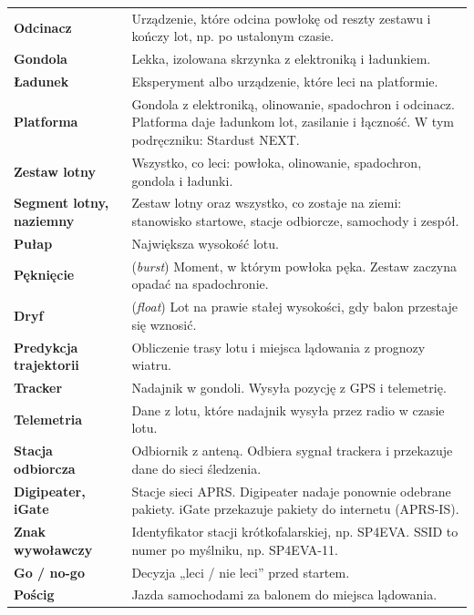 \begin{tabularx}{\linewidth}{@{}>{\bfseries}P{33mm}L@{}}
Odcinacz & Urządzenie, które odcina powłokę od reszty zestawu i kończy lot, np. po ustalonym czasie.\\
Gondola & Lekka, izolowana skrzynka z elektroniką i ładunkiem.\\
Ładunek & Eksperyment albo urządzenie, które leci na platformie.\\
Platforma & Gondola z elektroniką, olinowanie, spadochron i odcinacz. Platforma daje ładunkom lot, zasilanie i łączność. W tym podręczniku: Stardust NEXT.\\
Zestaw lotny & Wszystko, co leci: powłoka, olinowanie, spadochron, gondola i ładunki.\\
Segment lotny, naziemny & Zestaw lotny oraz wszystko, co zostaje na ziemi: stanowisko startowe, stacje odbiorcze, samochody i zespół.\\
Pułap & Największa wysokość lotu.\\
Pęknięcie & (\emph{burst}) Moment, w którym powłoka pęka. Zestaw zaczyna opadać na spadochronie.\\
Dryf & (\emph{float}) Lot na prawie stałej wysokości, gdy balon przestaje się wznosić.\\
Predykcja trajektorii & Obliczenie trasy lotu i miejsca lądowania z prognozy wiatru.\\
Tracker & Nadajnik w gondoli. Wysyła pozycję z GPS i telemetrię.\\
Telemetria & Dane z lotu, które nadajnik wysyła przez radio w czasie lotu.\\
Stacja odbiorcza & Odbiornik z anteną. Odbiera sygnał trackera i przekazuje dane do sieci śledzenia.\\
Digipeater, iGate & Stacje sieci APRS. Digipeater nadaje ponownie odebrane pakiety. iGate przekazuje pakiety do internetu (APRS-IS).\\
Znak wywoławczy & Identyfikator stacji krótkofalarskiej, np. SP4EVA. SSID to numer po myślniku, np. SP4EVA-11.\\
Go / no-go & Decyzja „leci / nie leci” przed startem.\\
Pościg & Jazda samochodami za balonem do miejsca lądowania.\\
\bottomrule
\end{tabularx}

\clearpage
